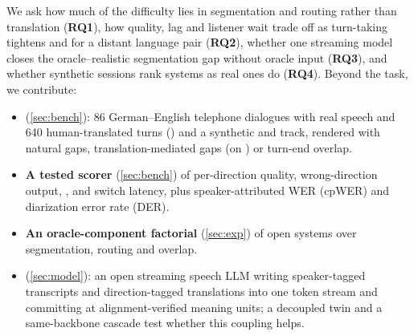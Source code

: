 We ask how much of the difficulty lies in segmentation and routing rather than translation (\textbf{RQ1}), how quality, lag and listener wait trade off as turn-taking tightens and for a distant language pair (\textbf{RQ2}), whether one streaming model closes the oracle--realistic segmentation gap without oracle input (\textbf{RQ3}), and whether synthetic sessions rank systems as real ones do (\textbf{RQ4}).
Beyond the task, we contribute:
\begin{itemize}\setlength{\itemsep}{0pt}\setlength{\parsep}{0pt}\setlength{\parskip}{0pt}
  \item \textbf{\bench} (\cref{sec:bench}): 86 German--English telephone dialogues \citep{bas2001taxi,reichel2016bas} with real speech and 640 human-translated turns (\taxi) and a synthetic  and  track, rendered with natural gaps, translation-mediated gaps (on \taxi) or turn-end overlap. 
  \item \textbf{A tested scorer} (\cref{sec:bench}) of per-direction quality, wrong-direction output, \laal, \eo and switch latency, plus speaker-attributed WER (cpWER) and diarization error rate (DER). 
  \item \textbf{An oracle-component factorial} (\cref{sec:exp}) of open systems over segmentation, routing and overlap. 
  \item \textbf{\model} (\cref{sec:model}): an open streaming speech LLM writing speaker-tagged transcripts and direction-tagged translations into one token stream and committing at alignment-verified meaning units; a decoupled twin and a same-backbone cascade test whether this coupling helps. 
\end{itemize}
